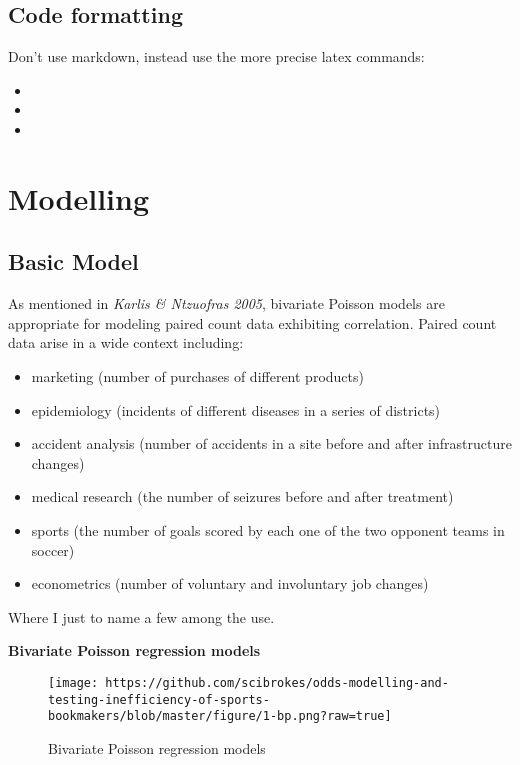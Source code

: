 \documentclass[article]{jss}
\providecommand{\tightlist}{%
  \setlength{\itemsep}{0pt}\setlength{\parskip}{0pt}}
\begin{document}
\subsection{Code formatting}\label{code-formatting}

Don't use markdown, instead use the more precise latex commands:

\begin{itemize}
\tightlist
\item
\item
\item
\end{itemize}

\section{Modelling}\label{modelling}

\subsection{Basic Model}\label{basic-model}

As mentioned in \emph{Karlis \& Ntzuofras 2005}, bivariate Poisson
models are appropriate for modeling paired count data exhibiting
correlation. Paired count data arise in a wide context including:

\begin{itemize}
\tightlist
\item
  marketing (number of purchases of different products)
\item
  epidemiology (incidents of different diseases in a series of
  districts)
\item
  accident analysis (number of accidents in a site before and after
  infrastructure changes)
\item
  medical research (the number of seizures before and after treatment)
\item
  sports (the number of goals scored by each one of the two opponent
  teams in soccer)
\item
  econometrics (number of voluntary and involuntary job changes)
\end{itemize}

Where I just to name a few among the use. \bigbreak

\textbf{Bivariate Poisson regression models}

\begin{figure}[htbp]
\centering
\texttt{[image: https://github.com/scibrokes/odds-modelling-and-testing-inefficiency-of-sports-bookmakers/blob/master/figure/1-bp.png?raw=true]}
\caption{Bivariate Poisson regression models}
\end{figure}
\end{document}
